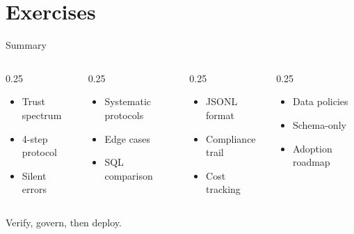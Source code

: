 \documentclass[aspectratio=169]{beamer}
\begin{document}
\section{Exercises}

\begin{frame}{Summary}
\begin{columns}[T]
\begin{column}{0.25\textwidth}
\begin{shadedbox}[title=\textbf{Verification}]
\begin{itemize}\scriptsize
  \item Trust spectrum
  \item 4-step protocol
  \item Silent errors
\end{itemize}
\end{shadedbox}
\end{column}
\begin{column}{0.25\textwidth}
\begin{shadedbox}[title=\textbf{Red-Teaming}]
\begin{itemize}\scriptsize
  \item Systematic protocols
  \item Edge cases
  \item SQL comparison
\end{itemize}
\end{shadedbox}
\end{column}
\begin{column}{0.25\textwidth}
\begin{shadedbox}[title=\textbf{Audit Logs}]
\begin{itemize}\scriptsize
  \item JSONL format
  \item Compliance trail
  \item Cost tracking
\end{itemize}
\end{shadedbox}
\end{column}
\begin{column}{0.25\textwidth}
\begin{shadedbox}[title=\textbf{Governance}]
\begin{itemize}\scriptsize
  \item Data policies
  \item Schema-only
  \item Adoption roadmap
\end{itemize}
\end{shadedbox}
\end{column}
\end{columns}
\vspace{0.5cm}
\begin{center}
\alert{Verify, govern, then deploy.}
\end{center}
\end{frame}
\end{document}
